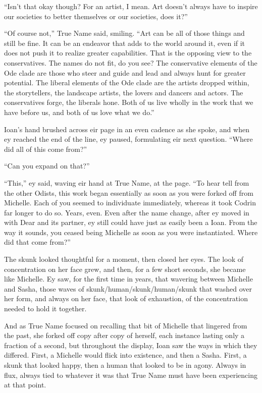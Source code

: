 ``Isn't that okay though? For an artist, I mean. Art doesn't always have to inspire our societies to better themselves or our societies, does it?''

``Of course not,'' True Name said, smiling. ``Art can be all of those things and still be fine. It can be an endeavor that adds to the world around it, even if it does not push it to realize greater capabilities. That is the opposing view to the conservatives. The names do not fit, do you see? The conservative elements of the Ode clade are those who steer and guide and lead and always hunt for greater potential. The liberal elements of the Ode clade are the artists dropped within, the storytellers, the landscape artists, the lovers and dancers and actors. The conservatives forge, the liberals hone. Both of us live wholly in the work that we have before us, and both of us love what we do.''

Ioan's hand brushed across eir page in an even cadence as she spoke, and when ey reached the end of the line, ey paused, formulating eir next question. ``Where did all of this come from?''

``Can you expand on that?''

``This,'' ey said, waving eir hand at True Name, at the page. ``To hear tell from the other Odists, this work began essentially as soon as you were forked off from Michelle. Each of you seemed to individuate immediately, whereas it took Codrin far longer to do so. Years, even. Even after the name change, after ey moved in with Dear and its partner, ey still could have just as easily been a Ioan. From the way it sounds, you ceased being Michelle as soon as you were instantiated. Where did that come from?''

The skunk looked thoughtful for a moment, then closed her eyes. The look of concentration on her face grew, and then, for a few short seconds, she became like Michelle. Ey saw, for the first time in years, that wavering between Michelle and Sasha, those waves of skunk/human/skunk/human/skunk that washed over her form, and always on her face, that look of exhaustion, of the concentration needed to hold it together.

And as True Name focused on recalling that bit of Michelle that lingered from the past, she forked off copy after copy of herself, each instance lasting only a fraction of a second, but throughout the display, Ioan saw the ways in which they differed. First, a Michelle would flick into existence, and then a Sasha. First, a skunk that looked happy, then a human that looked to be in agony. Always in flux, always tied to whatever it was that True Name must have been experiencing at that point.

